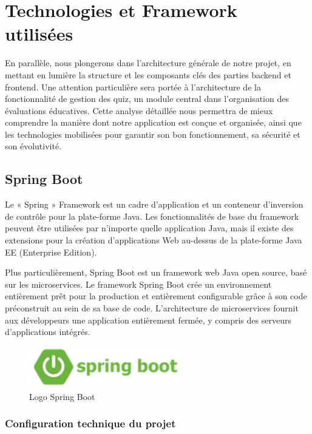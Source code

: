 \documentclass[12pt,a4paper]{report}
\begin{document}
\section{Technologies et Framework utilisées}

En parallèle, nous plongerons dans l'architecture générale de notre projet, en mettant en lumière la structure et les composants clés des parties backend et frontend. Une attention particulière sera portée à l'architecture de la fonctionnalité de gestion des quiz, un module central dans l'organisation des évaluations éducatives. Cette analyse détaillée nous permettra de mieux comprendre la manière dont notre application est conçue et organisée, ainsi que les technologies mobilisées pour garantir son bon fonctionnement, sa sécurité et son évolutivité.

\subsection{Spring Boot}

Le « Spring » Framework est un cadre d'application et un conteneur d'inversion de contrôle pour la plate-forme Java. Les fonctionnalités de base du framework peuvent être utilisées par n'importe quelle application Java, mais il existe des extensions pour la création d'applications Web au-dessus de la plate-forme Java EE (Enterprise Edition).

Plus particulièrement, Spring Boot est un framework web Java open source, basé sur les microservices. Le framework Spring Boot crée un environnement entièrement prêt pour la production et entièrement configurable grâce à son code préconstruit au sein de sa base de code. L'architecture de microservices fournit aux développeurs une application entièrement fermée, y compris des serveurs d'applications intégrés.

\begin{figure}[H]
\centering
\includegraphics[width=0.6\textwidth]{latex_media/media/image23.png}
\caption{Logo Spring Boot}
\label{fig:logo-spring-boot}
\end{figure}

\subsubsection{Configuration technique du projet}
\end{document}
